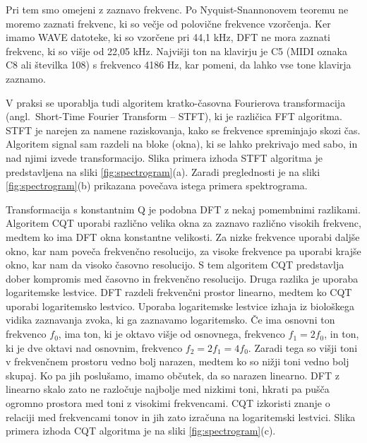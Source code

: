 \documentclass[a4paper, 12pt, openright]{book}
\newcommand{\en}{angl.}
\begin{document}
Pri tem smo omejeni z zaznavo frekvenc.
Po Nyquist-Snannonovem teoremu ne moremo zaznati frekvenc, ki so večje od polovične frekvence vzorčenja.
Ker imamo WAVE datoteke, ki so vzorčene pri 44,1 kHz, DFT ne mora zaznati frekvenc, ki so višje od 22,05 kHz.
Najvišji ton na klavirju je C5 (MIDI oznaka C8 ali številka 108) s frekvenco 4186 Hz, kar pomeni, da lahko vse tone klavirja zaznamo.

V praksi se uporablja tudi algoritem kratko-časovna Fourierova transformacija (\en\ Short-Time Fourier Transform -- STFT), ki je različica FFT algoritma.
STFT je narejen za namene raziskovanja, kako se frekvence spreminjajo skozi čas.
Algoritem signal sam razdeli na bloke (okna), ki se lahko prekrivajo med sabo, in nad njimi izvede transformacijo.
Slika primera izhoda STFT algoritma je predstavljena na sliki \ref{fig:spectrogram}(a). Zaradi preglednosti je na sliki \ref{fig:spectrogram}(b) prikazana povečava istega primera spektrograma.

Transformacija s konstantnim Q \cite{brown1991cqt} je podobna DFT z nekaj pomembnimi razlikami.
Algoritem CQT uporabi različno velika okna za zaznavo različno visokih frekvenc, medtem ko ima DFT okna konstantne velikosti.
Za nizke frekvence uporabi daljše okno, kar nam poveča frekvenčno resolucijo, za visoke frekvence pa uporabi krajše okno, kar nam da visoko časovno resolucijo.
S tem algoritem CQT predstavlja dober kompromis med časovno in frekvenčno resolucijo.
Druga razlika je uporaba logaritemske lestvice.
DFT razdeli frekvenčni prostor linearno, medtem ko CQT uporabi logaritemsko lestvico.
Uporaba logaritemske lestvice izhaja iz biološkega vidika zaznavanja zvoka, ki ga zaznavamo logaritemsko.
Če ima osnovni ton frekvenco $ f_{0} $, ima ton, ki je oktavo višje od osnovnega, frekvenco $ f_{1} = 2 f_{0} $, in ton, ki je dve oktavi nad osnovnim, frekvenco $ f_{2} = 2 f_{1} = 4 f_{0} $.
Zaradi tega so višji toni v frekvenčnem prostoru vedno bolj narazen, medtem ko so nižji toni vedno bolj skupaj.
Ko pa jih poslušamo, imamo občutek, da so narazen linearno.
DFT z linearno skalo zato ne razločuje najbolje med nizkimi toni, hkrati pa pušča ogromno prostora med toni z visokimi frekvencami.
CQT izkoristi znanje o relaciji med frekvencami tonov in jih zato izračuna na logaritemski lestvici.
Slika primera izhoda CQT algoritma je na sliki \ref{fig:spectrogram}(c).
\end{document}
